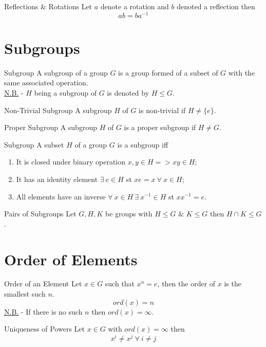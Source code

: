 \documentclass[11pt,a4paper]{article}
\begin{document}
\subtitle{Proposition 4.04 - }{Reflections \& Rotations}
Let $a$ denote a rotation and $b$ denoted a reflection then $$ab = ba^{-1}$$

\section{Subgroups}

\subtitle{Definition 5.01 - }{Subgroup}
A subgroup of a group $G$ is a group formed of a subset of $G$ with the same associated operation.\\
\underline{N.B.} - $H$ being a subgroup of $G$ is denoted by $H \leq G$.\\

\subtitle{Definition 5.02 - }{Non-Trivial Subgroup}
A subgroup $H$ of $G$ is non-trivial if $H \not = \{ e \}$.\\

\subtitle{Definition 5.03 - }{Proper Subgroup}
A subgroup $H$ of $G$ is a proper subgroup if $H \not = G$.\\

\subtitle{Theorem 5.04 - }{Subgroup}
A subset $H$ of a group $G$ is a subgroup iff
\begin{enumerate}[label=\roman*)]
  \item It is closed under binary operation $x, y \in H => xy \in H$;
  \item It has an identity element $\exists\ e \in H$ st $xe = x\ \forall\ x \in H$;
  \item All elements have an inverse $\forall\ x \in H\ \exists\ x^{-1} \in H$ st $xx^{-1} = e$.\\
\end{enumerate}

\subtitle{Proposition 5.05 - }{Pairs of Subgroups}
Let $G, H, K$ be groups with $H \leq G$ \& $K \leq G$ then $H \cap K \leq G$.\\

\section{Order of Elements}

\subtitle{Definition 6.01 - }{Order of an Element}
Let $x \in G$ such that $x^n = e$, then the order of $x$ is the smallest such $n$.$$ord(x) = n$$
\underline{N.B.} - If there is no such $n$ then $ord(x) = \infty$.\\

\subtitle{Proposition 6.02 - }{Uniqueness of Powers}
Let $x \in G$ with $ord(x) = \infty$ then $$x^i \not = x^j\ \forall\ i \not = j$$
\end{document}
